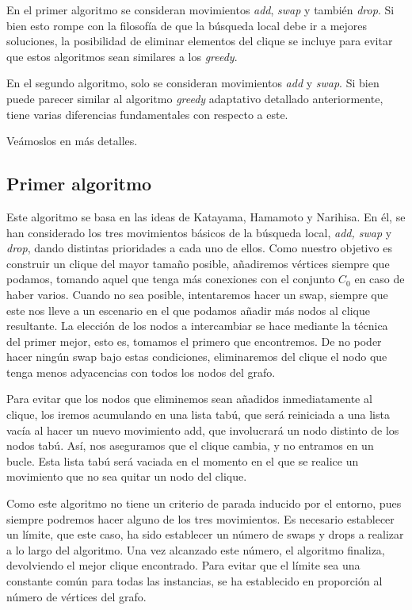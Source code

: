 En el primer algoritmo se consideran movimientos \textit{add}, \textit{swap} y también \textit{drop}.
Si bien esto rompe con la filosofía de que la búsqueda local debe ir a mejores soluciones, la posibilidad de
eliminar elementos del clique se incluye para evitar que estos algoritmos sean similares a los
\textit{greedy}.

En el segundo algoritmo, solo se consideran movimientos \textit{add} y \textit{swap}. Si bien puede
parecer similar al algoritmo \textit{greedy} adaptativo detallado anteriormente, tiene varias diferencias
fundamentales con respecto a este.

Veámoslos en más detalles.

\subsection{Primer algoritmo}

Este algoritmo se basa en las ideas de Katayama, Hamamoto y Narihisa. En él, se han considerado
los tres movimientos básicos de la búsqueda local, \textit{add, swap} y \textit{drop},
dando distintas prioridades a cada uno de ellos. Como nuestro objetivo es construir un clique del
mayor tamaño posible, añadiremos vértices siempre que podamos, tomando aquel que tenga más conexiones
con el conjunto $C_0$ en caso de haber varios. Cuando no sea posible, intentaremos
hacer un swap, siempre que este nos lleve a un escenario en el que podamos añadir más nodos
al clique resultante. La elección de los nodos a intercambiar se hace mediante la técnica del
primer mejor, esto es, tomamos el primero que encontremos. De no poder hacer ningún swap bajo
estas condiciones, eliminaremos del clique el nodo que tenga menos adyacencias con todos los nodos del grafo.

Para evitar que los nodos que eliminemos sean añadidos inmediatamente al clique,
los iremos acumulando en una lista tabú, que será reiniciada a una lista vacía al hacer
un nuevo movimiento add, que involucrará un nodo distinto de los nodos tabú. Así, nos aseguramos
que el clique cambia, y no entramos en un bucle. Esta lista tabú será vaciada en el momento en el
que se realice un movimiento que no sea quitar un nodo del clique.

Como este algoritmo no tiene un criterio de parada inducido por el entorno, pues siempre podremos
hacer alguno de los tres movimientos. Es necesario establecer un límite, que este caso, ha
sido establecer un número de swaps y drops a realizar a lo largo del algoritmo. Una vez alcanzado
este número, el algoritmo finaliza, devolviendo el mejor clique encontrado.
Para evitar que el límite sea una constante común para todas las instancias, se ha establecido en proporción
al número de vértices del grafo.

